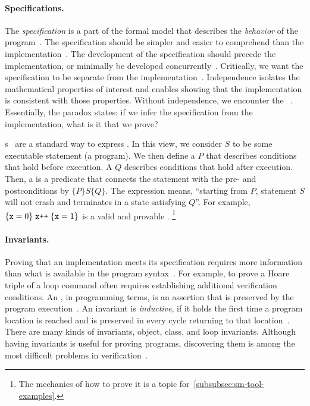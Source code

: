 \paragraph*{Specifications.} The \emph{specification}
is a part of the formal model that describes the \emph{behavior} of the
program~\cite{zave2023b}. The specification should be simpler and easier to
comprehend than the implementation~\cite{zave2023b}. The development of the
specification should precede the implementation, or minimally be developed
concurrently~\cite{dijkstra1972}. Critically, we want the specification to be
{separate} from the implementation~\cite{furia2014b}. Independence isolates the
mathematical properties of interest and enables showing that the implementation
is consistent with those properties. Without independence, we encounter the
\emph{}~\cite{furia2014b}. Essentially, the
paradox states: if we infer the specification from the implementation, what is
it that we prove?

s~\cite{hoare1969} are a standard way to express .
In this view, we consider \(S\) to be some executable statement (a program).
We then define a \emph{} \(P\) that describes conditions that hold before execution.
A \emph{} \(Q\) describes conditions that hold after execution.
Then, a \emph{} is a predicate that connects the statement with the pre- and postconditions by \(\{P\} S \{Q\}\).
The expression means, \enquote{starting from \(P\), statement \(S\) will not crash and terminates in a state satisfying \(Q\)}.
For example, \(\{ \prm{x}=0 \}\;\prm{x++}\;\{\prm{x}=1\}\) is a valid and provable .%
\footnote{The mechanics of how to prove it is a topic for~\autoref{subsubsec:sm-tool-examples}.}

\paragraph*{Invariants.}
Proving that an implementation meets its specification requires more information than what is available in the program syntax~\cite{chang2005}.
For example, to prove a Hoare triple of a loop command often requires establishing additional verification conditions.
An \emph{}, in programming terms, is an assertion that is preserved by the program execution~\cite{furia2014}.
An invariant is \emph{inductive},
if it holds the first time a program location is reached and is preserved in every cycle returning to that location~\cite{sankaranarayanan2004}.
There are many kinds of invariants, \eg object, class, and loop invariants.
Although having invariants is useful for proving programs, discovering them is among the most difficult problems in verification~\cite{dillig2013,yu2023}.

